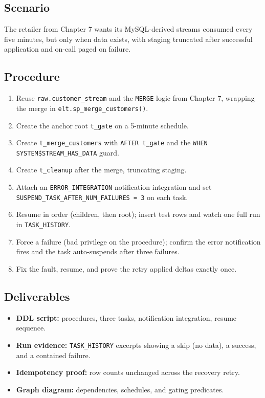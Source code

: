 \subsection*{Scenario}
The retailer from Chapter 7 wants its MySQL-derived streams consumed every five minutes, but only when data exists, with staging truncated after successful application and on-call paged on failure.

\subsection*{Procedure}
\begin{enumerate}
    \item Reuse \texttt{raw.customer\_stream} and the \texttt{MERGE} logic from Chapter 7, wrapping the merge in \texttt{elt.sp\_merge\_customers()}.
    \item Create the anchor root \texttt{t\_gate} on a 5-minute schedule.
    \item Create \texttt{t\_merge\_customers} with \texttt{AFTER t\_gate} and the \texttt{WHEN SYSTEM\$STREAM\_HAS\_DATA} guard.
    \item Create \texttt{t\_cleanup} after the merge, truncating staging.
    \item Attach an \texttt{ERROR\_INTEGRATION} notification integration and set \texttt{SUSPEND\_TASK\_AFTER\_NUM\_FAILURES = 3} on each task.
    \item Resume in order (children, then root); insert test rows and watch one full run in \texttt{TASK\_HISTORY}.
    \item Force a failure (bad privilege on the procedure); confirm the error notification fires and the task auto-suspends after three failures.
    \item Fix the fault, resume, and prove the retry applied deltas exactly once.
\end{enumerate}

\subsection*{Deliverables}
\begin{itemize}
    \item \textbf{DDL script:} procedures, three tasks, notification integration, resume sequence.
    \item \textbf{Run evidence:} \texttt{TASK\_HISTORY} excerpts showing a skip (no data), a success, and a contained failure.
    \item \textbf{Idempotency proof:} row counts unchanged across the recovery retry.
    \item \textbf{Graph diagram:} dependencies, schedules, and gating predicates.
\end{itemize}

